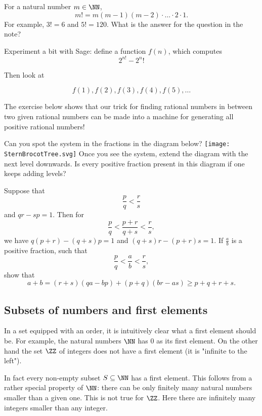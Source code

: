 \documentclass{article}
\begin{document}
For a natural number $m\in \NN$,
$$
m! = m (m-1) (m-2)\cdot \dots \cdot 2\cdot 1. 
$$
For example, $3! = 6$ and $5! = 120$. What is the answer for the
question in the note?

\begin{hint}[showhide]

Experiment a bit with Sage: define a function $f(n)$, which computes
$$
2^{n!} - 2^n!
$$

Then look at

$$
f(1), f(2), f(3), f(4), f(5), \dots
$$

\end{hint}
\endshex

The exercise below shows that our trick for finding rational numbers
in between two given rational numbers can be made into a machine for
generating all positive rational numbers!

\beginshex
Can you spot the system in the fractions in the diagram below?
\texttt{[image: SternBrocotTree.svg]}
Once you see the system, extend the diagram with the next level downwards. Is every
positive fraction present in this diagram if one keeps adding levels?

\begin{hint}[showhide]
Suppose that
$$
\frac{p}{q} < \frac{r}{s}
$$
and $q r - s p = 1$. Then for
$$
\frac{p}{q} <  \frac{p+r}{q+s} < \frac{r}{s},
$$
we have $q (p+r) - (q+s) p = 1$ and $(q+s) r - (p + r) s = 1$. If $\frac{a}{b}$ is 
a positive fraction, such that
$$
\frac{p}{q} <  \frac{a}{b} < \frac{r}{s},
$$
show that 
$$
a + b = (r+s)(q a - b p)+(p+q)(b r - a s)\geq p+q+r+s.
$$
\end{hint}
\endshex


\subsection{Subsets of numbers and first elements}\label{subsecfirst}

In a set equipped with an order, it is intuitively clear what a first element should be. For example,
the natural numbers $\NN$ has $0$ as its first element. On the other hand the set $\ZZ$ of
integers does not have a first element (it is "infinite to the left").

In fact every non-empty subset $S\subseteq \NN$ has
a first element. This follows from a rather special property of $\NN$: there
can be only finitely many natural numbers smaller than a given one. This is
not true for $\ZZ$. Here there are infinitely many integers smaller than
any integer.
\end{document}
